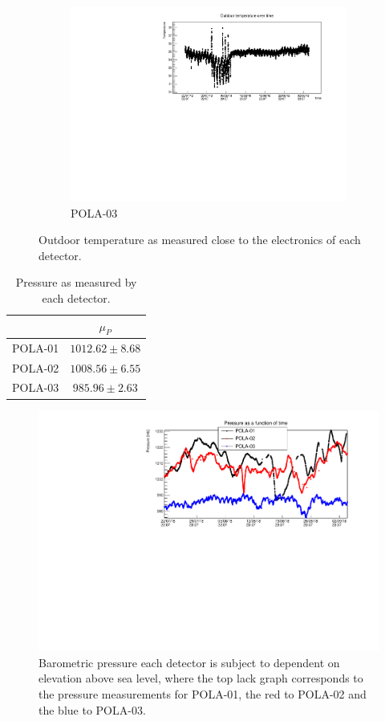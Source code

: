 \documentclass[12pt,a4paper]{amsart}
\begin{document}
\begin{figure}
\begin{subfigure}[b]{0.6\textwidth}
		\includegraphics[width=\textwidth]{../data/plots/POLA-03/OutdoorTemp_POLA-03.pdf}
		\caption{POLA-03}
		\label{fig:outdoortemp_POLA-03}
	\end{subfigure}
	\caption{Outdoor temperature as measured close to the electronics of each detector.}
	\label{fig:outdoortemp}
\end{figure}

\begin{table}[t]
\caption{Pressure as measured by each detector.}
\label{tab_pressure}
\begin{tabular}{c|c}
\hline\hline
        & $\mu_P$           \\ \hline
POLA-01 & $1012.62\pm 8.68$ \\
POLA-02 & $1008.56\pm 6.55$ \\
POLA-03 & $985.96\pm2.63$   \\
\hline \hline
\end{tabular}
\end{table}

\begin{figure}
	\centering
	\includegraphics[width=\textwidth]{../data/plots/pressure_all.pdf}
	\caption{Barometric pressure each detector is subject to dependent on elevation above sea level, where the top lack graph corresponds to the pressure measurements for POLA-01, the red to POLA-02 and the blue to POLA-03.}
	\label{fig:pressure}
\end{figure}
\end{document}
